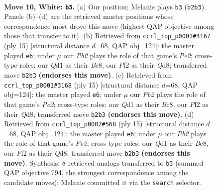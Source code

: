 \documentclass[11pt]{article}
\begin{document}
\clearpage

\begin{figure}[p]\centering
\begin{subfigure}{0.46\textwidth}\centering
\resizebox{\linewidth}{!}{%
\newchessgame
\chessboard[
  setfen={rnbq1rk1/4bpp1/4pn2/pppp2Np/7P/3P2PB/PPPNPP2/R1BQ1RK1 w - - 0 10},
  showmover=false,
  pgfstyle=straightmove, color=movearrow, markmove={b2-b3}
]}
\caption{}
\end{subfigure}\hfill
\begin{subfigure}{0.46\textwidth}\centering
\resizebox{\linewidth}{!}{%
\newchessgame
\chessboard[
  setfen={r1bq1rk1/ppppp1bp/2n3p1/5p2/3Pn3/1P3NP1/PBP1PPBP/RNQ2RK1 b - - 8 8},
  showmover=false,
  pgfstyle=straightmove, color=movearrow, markmove={e7-e6}
]}
\caption{}
\end{subfigure}
\\[4pt]
\begin{subfigure}{0.46\textwidth}\centering
\resizebox{\linewidth}{!}{%
\newchessgame
\chessboard[
  setfen={r1bq1rk1/ppppp1bp/2n3p1/5p2/3Pn3/1P3NP1/PBP1PPBP/RNQ2RK1 b - - 8 8},
  showmover=false,
  pgfstyle=straightmove, color=movearrow, markmove={e7-e6}
]}
\caption{}
\end{subfigure}\hfill
\begin{subfigure}{0.46\textwidth}\centering
\resizebox{\linewidth}{!}{%
\newchessgame
\chessboard[
  setfen={r1bq1rk1/ppppp1bp/2n3p1/5p2/3Pn3/1P3NP1/PBP1PPBP/RNQ2RK1 b - - 8 8},
  showmover=false,
  pgfstyle=straightmove, color=movearrow, markmove={e7-e6}
]}
\caption{}
\end{subfigure}
\caption{\textbf{Move 10, White: \texttt{b3}.} (a) Our position; Melanie plays \texttt{b3} (\texttt{b2b3}). Panels (b)--(d) are the retrieved master positions whose correspondence most drove this move (highest QAP objective among those that transfer to it). (b) Retrieved from \texttt{ccrl\_top\_p0001\#3167} (ply 15) [structural distance $d$=68, QAP obj=124]: the master played \texttt{e6}; under $\mu$ our \emph{Pb2} plays the role of that game's \emph{Pe2}; cross-type roles: our \emph{Q}d1 as their \emph{B}c8, our \emph{P}f2 as their \emph{Q}d8; transferred move \texttt{b2b3} \textbf{(endorses this move)}. (c) Retrieved from \texttt{ccrl\_top\_p0001\#3168} (ply 15) [structural distance $d$=68, QAP obj=124]: the master played \texttt{e6}; under $\mu$ our \emph{Pb2} plays the role of that game's \emph{Pe2}; cross-type roles: our \emph{Q}d1 as their \emph{B}c8, our \emph{P}f2 as their \emph{Q}d8; transferred move \texttt{b2b3} \textbf{(endorses this move)}. (d) Retrieved from \texttt{ccrl\_top\_p0002\#568} (ply 15) [structural distance $d$=68, QAP obj=124]: the master played \texttt{e6}; under $\mu$ our \emph{Pb2} plays the role of that game's \emph{Pe2}; cross-type roles: our \emph{Q}d1 as their \emph{B}c8, our \emph{P}f2 as their \emph{Q}d8; transferred move \texttt{b2b3} \textbf{(endorses this move)}. Synthesis: 8 retrieved analogs transferred to \texttt{b3} (summed QAP objective 794, the strongest correspondence among the candidate moves); Melanie committed it via the \texttt{search} selector.}
\label{fig:thought-m18}
\end{figure}
\end{document}
